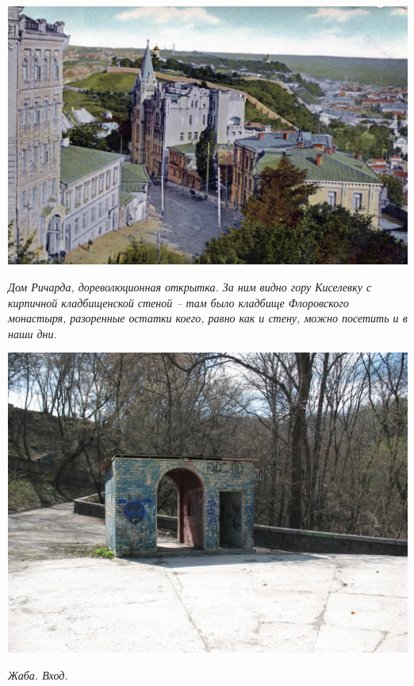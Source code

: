 \newpage
\vspace*{\fill}

\begin{center}
\includegraphics[width=\linewidth]{rpix/domrich.jpg}

\textit{Дом Ричарда, дореволюционная открытка. За ним видно гору Киселевку с кирпичной кладбищенской стеной – там было кладбище Флоровского монастыря, разоренные остатки коего, равно как и стену, можно посетить и в наши дни.}
\end{center}
\vspace*{\fill}


\newpage

\begin{center}
\includegraphics[width=\linewidth]{rpix/IMG_1401.JPG}

\textit{Жаба. Вход.}
\end{center}


